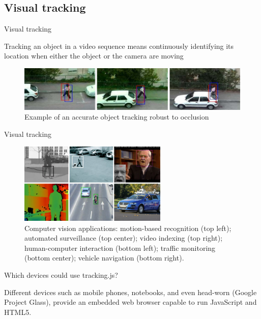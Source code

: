 \documentclass{beamer}
\begin{document}
\subsection{Visual tracking}
\begin{frame}{Visual tracking}
  \begin{block}{}
      Tracking an object in a video sequence means continuously identifying its location when either the object or the camera are moving
  \end{block}
  \begin{figure}[!htb]
    \centering
    \includegraphics[width=\linewidth]{../chapters/basic_concepts/tracking_occlusion.png}
    \caption{Example of an accurate object tracking robust to occlusion}
    \label{figure:tracking_occlusion}
  \end{figure}
\end{frame}
\begin{frame}{Visual tracking}
  \begin{figure}[!htb]
    \centering
    \includegraphics[width=200pt]{../chapters/basic_concepts/cv_applications.png}
    \caption{Computer vision applications: motion-based recognition (top left); automated surveillance (top center); video indexing (top right); human-computer interaction (bottom left); traffic monitoring (bottom center); vehicle navigation (bottom right).}
    \label{figure:cv_applications}
  \end{figure}
\end{frame}

\begin{frame}{Which devices could use tracking.js?}
  \begin{block}{}
      Different devices such as mobile phones, notebooks, and even head-worn (Google Project Glass), provide an embedded web browser capable to run JavaScript and HTML5.
  \end{block}
\end{frame}
\end{document}
